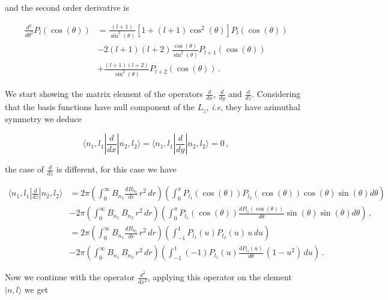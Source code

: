 \documentclass[12pt,a4paper]{article}
\newcommand{\dx}[1]{\frac{d{#1}}{dx}}
\newcommand{\dy}[1]{\frac{d{#1}}{dy}}
\newcommand{\dz}[1]{\frac{d{#1}}{dz}}
\newcommand{\ddx}[1]{\frac{d^2{#1}}{dx^2}}
\newcommand{\dr}[1]{\frac{d{#1}}{dr}}
\newcommand{\dt}[1]{\frac{d{#1}}{d\theta}}
\newcommand{\ddt}[1]{\frac{d^2{#1}}{d\theta^2}}
\newcommand{\ct}{\cos(\theta)}
\newcommand{\cct}{\cos^2(\theta)}
\newcommand{\st}{\sin(\theta)}
\newcommand{\sst}{\sin^2(\theta)}
\begin{document}
\noindent and the second order derivative is

\begin{equation}
\begin{split}
\ddt{} P_l(\ct) &= \frac{(l+1)}{\sst} \left[1 + (l+1) \cct\right]P_l(\ct) \\
              &- 2(l+1)(l+2) \frac{\ct}{\sst}P_{l+1}(\ct) \\
              &+ \frac{(l+1)(l+2)}{\sst} P_{l+2}(\ct)\,.
\end{split}
\end{equation}

We start showing the matrix element of the operators $\dx{}$, $\dy{}$ and $\dz{}$.
Considering that the basis functions have null component of the $L_z$, {\it i.e},
they have azimuthal symmetry we deduce

\begin{equation}
\langle n_1,l_1|\dx{}|n_2,l_2\rangle = \langle n_1,l_1|\dy{}|n_2,l_2\rangle = 0\,,
\end{equation}

\noindent the case of $\dz{}$ is different, for this case we have

\begin{equation}
\begin{split}
\langle n_1,l_1|\dz{}|n_2,l_2\rangle &= 2\pi\left(\int_0^{\infty} B_{n_1}\dr{B_{n_2}}\,r^2\,dr \right)
                                            \left(\int_0^{\pi} P_{l_1}(\ct)P_{l_2}(\ct)\ct\st d\theta\right) \\
                                     &- 2\pi\left(\int_0^{\infty} B_{n_1}\,B_{n_2}\,r^2\,dr \right)
                                            \left(\int_0^{\pi} P_{l_1}(\ct)\dt{P_{l_2}(\ct)}\st\st d\theta\right)\,, \\
                                     &= 2\pi\left(\int_0^{\infty} B_{n_1}\dr{B_{n_2}}\,r^2\,dr \right)
                                            \left(\int_{-1}^{1} P_{l_1}(u)P_{l_2}(u)\,u\, du\right) \\
                                     &- 2\pi\left(\int_0^{\infty} B_{n_1}\,B_{n_2}\,r^2\,dr \right)
                                            \left(\int_{-1}^{1}(-1) P_{l_1}(u)\dt{P_{l_2}(u)}\,(1-u^2)\,du\right)\,.
\end{split}
\end{equation}

Now we continue with the operator $\ddx{}$, applying this operator on the element
$|n,l\rangle$ we get
\end{document}
